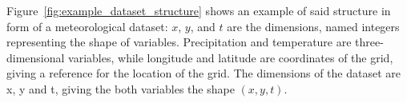 Figure~\ref{fig:example_dataset_structure} shows an example of said structure in form of a meteorological dataset: $x$, $y$, and $t$ are the dimensions, named integers representing the shape of variables. 
Precipitation and temperature are three-dimensional variables, while longitude and latitude are coordinates of the grid, giving a reference for the location of the grid. The dimensions of the dataset are x, y and t, giving the both variables the shape $(x, y, t)$. \cite{hoyer_xarray_2017}



